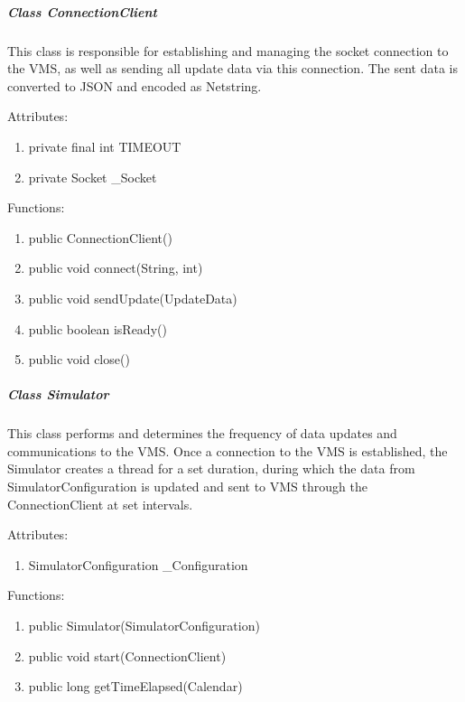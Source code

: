 \documentclass{article}
\begin{document}
\subparagraph{Class ConnectionClient}
This class is responsible for establishing and managing the socket connection to the VMS, as well as sending all update data via this connection. The sent data is converted to JSON and encoded as Netstring.

\vspace{0.5cm}

Attributes:
\begin{enumerate}
	\item private final int TIMEOUT
    \item private Socket \_Socket
\end {enumerate}

\vspace{0.5cm}

Functions:
\begin{enumerate}
	\item public ConnectionClient()
	\item public void connect(String, int)
	\item public void sendUpdate(UpdateData)
	\item public boolean isReady()
	\item public void close()
\end{enumerate}

\subparagraph{Class Simulator}
This class performs and determines the frequency of data updates and communications to the VMS. Once a connection to the VMS is established, the Simulator creates a thread for a set duration, during which the data from SimulatorConfiguration is updated and sent to VMS through the ConnectionClient at set intervals.

\vspace{0.5cm}

Attributes:
\begin{enumerate}
	\item SimulatorConfiguration \_Configuration
\end {enumerate}

\vspace{0.5cm}

Functions:
\begin{enumerate}
	\item public Simulator(SimulatorConfiguration)
	\item public void start(ConnectionClient)
	\item public long getTimeElapsed(Calendar)
\end{enumerate}

\vspace{0.25cm}
\end{document}
